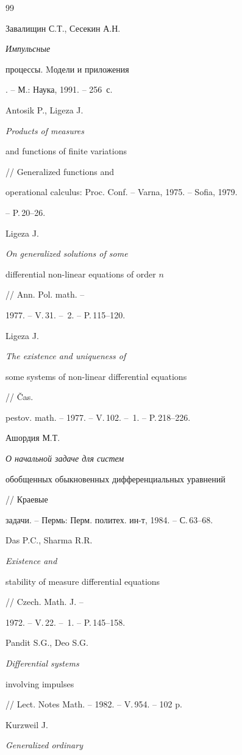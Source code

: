 \begin{thebibliography}{99}







Завалищин С.Т., Сесекин А.Н. {\em Импульсные


процессы. Mодели и приложения}. -- М.: Наука, 1991. -- 256~с.




Antosik P., Ligeza J. {\em Products of measures


and functions of finite variations} // Generalized functions  and


operational  calculus:  Proc. Conf. -- Varna, 1975. -- Sofia, 1979.


-- P.\,20--26.




Ligeza J. {\em On generalized solutions of some


differential non-linear equations of order $n$} // Ann. Pol. math. --


1977. -- V.\,31. -- \No\,2. -- P.\,115--120.




Ligeza J. {\em The existence and uniqueness of


some systems of non-linear differential equations} // \v{C}as.


pestov. math. -- 1977. -- V.\,102. -- \No\,1. -- P.\,218--226.




Ашордия М.Т. {\em О начальной задаче для систем


обобщенных обыкновенных дифференциальных уравнений} // Краевые


задачи. -- Пермь: Перм. политех. ин-т, 1984. -- С.\,63--68.




Das P.C., Sharma R.R. {\em Existence and


stability of measure differential equations} // Czech. Math. J. --


1972. -- V.\,22. -- \No\,1. -- P.\,145--158.




Pandit S.G., Deo S.G. {\em Differential systems


involving impulses} // Lect. Notes Math. -- 1982. -- V.\,954. -- 102 p.




Kurzweil J. {\em Generalized ordinary


}
\end{thebibliography}
